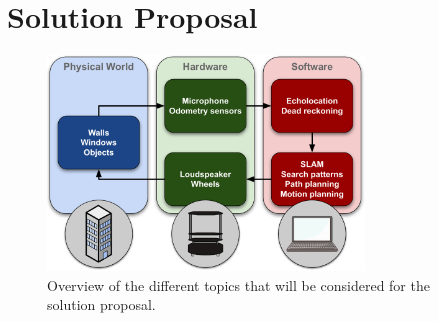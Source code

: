 \chapter{Solution Proposal}\label{Chapter:Solution_proposal}






\begin{figure}[H]
    \centering
    \includegraphics[width=0.75\textwidth]{figures/2Solution_proposal/Intro_solution_proposal.pdf}
    \caption{Overview of the different topics that will be considered for the solution proposal.}
    \label{fig:sp_overview}
\end{figure}



















